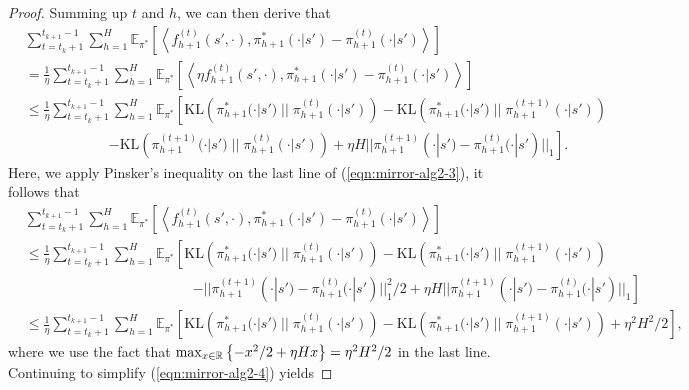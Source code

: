 \begin{proof}
Summing up $t$ and $h$, we can then derive that
\begin{align}\label{eqn:mirror-alg2-3}
    &\sum_{t=t_k+1}^{t_{k+1}-1} \sum_{h=1}^H \mathbb{E}_{\pi^*}\left[\left\langle f_{h+1}^{(t)}(s', \cdot), \pi_{h+1}^{*}(\cdot | s') - \pi_{h+1}^{(t)}(\cdot | s')\right\rangle \right]\nonumber\\
    &= \frac{1}{\eta} \sum_{t=t_k+1}^{t_{k+1}-1} \sum_{h=1}^H \mathbb{E}_{\pi^*}\left[ \left\langle \eta f_{h+1}^{(t)}(s', \cdot), \pi_{h+1}^{*}(\cdot | s') - \pi_{h+1}^{(t)}(\cdot | s')\right\rangle\right] \nonumber\\
    &\leq \frac{1}{\eta} \sum_{t=t_k+1}^{t_{k+1}-1} \sum_{h=1}^H \mathbb{E}_{\pi^*}\left[\text{KL}\left(\pi_{h+1}^{*}(\cdot | s')\; || \;\pi_{h+1}^{(t)}(\cdot | s')\right) - \text{KL}\left(\pi_{h+1}^{*}(\cdot | s')\; || \;\pi_{h+1}^{(t+1)}(\cdot | s')\right) \right.\nonumber\\
    &\qquad\qquad\qquad \left.- \text{KL}\left(\pi_{h+1}^{(t+1)}(\cdot | s')\; || \;\pi_{h+1}^{(t)}(\cdot | s')\right) + \eta H ||\pi_{h+1}^{(t+1)}(\cdot | s') - \pi_{h+1}^{(t)}(\cdot | s')||_1\right].
\end{align}
Here, we apply Pinsker's inequality on the last line of (\ref{eqn:mirror-alg2-3}), it follows that
\begin{align}\label{eqn:mirror-alg2-4}
    &\sum_{t=t_k+1}^{t_{k+1}-1} \sum_{h=1}^H \mathbb{E}_{\pi^*}\left[\left\langle f_{h+1}^{(t)}(s', \cdot), \pi_{h+1}^{*}(\cdot | s') - \pi_{h+1}^{(t)}(\cdot | s')\right\rangle \right] \nonumber\\
    &\leq \frac{1}{\eta} \sum_{t=t_k+1}^{t_{k+1}-1}  \sum_{h=1}^H \mathbb{E}_{\pi^*}\left[ \text{KL}\left(\pi_{h+1}^{*}(\cdot | s')\; || \;\pi_{h+1}^{(t)}(\cdot | s')\right) - \text{KL}\left(\pi_{h+1}^{*}(\cdot | s')\; || \;\pi_{h+1}^{(t+1)}(\cdot | s')\right) \right. \nonumber\\
    &\qquad\qquad\qquad\qquad\qquad\qquad  \left. - ||\pi_{h+1}^{(t+1)}(\cdot | s') - \pi_{h+1}^{(t)}(\cdot | s')||_1^2/2 + \eta H ||\pi_{h+1}^{(t+1)}(\cdot | s') - \pi_{h+1}^{(t)}(\cdot | s')||_1 \right] \nonumber\\
    &\leq \frac{1}{\eta} \sum_{t=t_k+1}^{t_{k+1}-1} \sum_{h=1}^H \mathbb{E}_{\pi^*}\left[ \text{KL}\left(\pi_{h+1}^{*}(\cdot | s')\; || \;\pi_{h+1}^{(t)}(\cdot | s')\right) - \text{KL}\left(\pi_{h+1}^{*}(\cdot | s')\; || \;\pi_{h+1}^{(t+1)}(\cdot | s')\right) + \eta^2H^2/2\right],
\end{align}
where we use the fact that $\max_{x\in {\mathbb{R}}}\left\{-x^2/2 + \eta H x\right\} = \eta^2H^2/2$ in the last line. Continuing to simplify (\ref{eqn:mirror-alg2-4}) yields

\end{proof}
